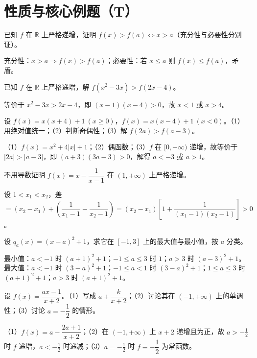 \section{性质与核心例题（T）}

\begin{problem}
已知 $f$ 在 $\mathbb{R}$ 上严格递增，证明 $f(x)>f(a)\iff x>a$（充分性与必要性分别证）。
\end{problem}
\begin{solution}
充分性：$x>a\Rightarrow f(x)>f(a)$；必要性：若 $x\le a$ 则 $f(x)\le f(a)$，矛盾。
\end{solution}

\begin{problem}
已知 $f$ 在 $\mathbb{R}$ 上严格递增，解 $f(x^2-3x)>f(2x-4)$。
\end{problem}
\begin{solution}
等价于 $x^2-3x>2x-4$，即 $(x-1)(x-4)>0$，故 $x<1$ 或 $x>4$。
\end{solution}

\begin{problem}
设 $f(x)=x(x+4)+1\ (x\ge0)$，$f(x)=x(x-4)+1\ (x<0)$。（1）用绝对值统一；（2）判断奇偶性；（3）解 $f(2a)>f(a-3)$。
\end{problem}
\begin{solution}
（1）$f(x)=x^2+4|x|+1$；（2）偶函数；（3）$f$ 在 $[0,+\infty)$ 递增，故等价于 $|2a|>|a-3|$，即 $(a+3)(3a-3)>0$，解得 $a<-3$ 或 $a>1$。
\end{solution}

\begin{problem}
不用导数证明 $f(x)=x-\dfrac{1}{x-1}$ 在 $(1,+\infty)$ 上严格递增。
\end{problem}
\begin{solution}
设 $1<x_1<x_2$，差 $=(x_2-x_1)+\left(\dfrac{1}{x_1-1}-\dfrac{1}{x_2-1}\right)=(x_2-x_1)\left[1+\dfrac{1}{(x_1-1)(x_2-1)}\right]>0$。
\end{solution}

\begin{problem}
设 $q_a(x)=(x-a)^2+1$，求它在 $[-1,3]$ 上的最大值与最小值，按 $a$ 分类。
\end{problem}
\begin{solution}
最小值：$a<-1$ 时 $(a+1)^2+1$；$-1\le a\le3$ 时 $1$；$a>3$ 时 $(a-3)^2+1$。
最大值：$a<-1$ 时 $(3-a)^2+1$；$-1\le a<1$ 时 $(3-a)^2+1$；$1\le a\le3$ 时 $(a+1)^2+1$；$a>3$ 时 $(a+1)^2+1$。
\end{solution}

\begin{problem}
设 $f(x)=\dfrac{ax-1}{x+2}$。（1）写成 $a+\dfrac{k}{x+2}$；（2）讨论其在 $(-1,+\infty)$ 上的单调性；（3）讨论 $a=-\dfrac12$ 的情形。
\end{problem}
\begin{solution}
（1）$f(x)=a-\dfrac{2a+1}{x+2}$；（2）在 $(-1,+\infty)$ 上 $x+2$ 递增且为正，故 $a>-\tfrac12$ 时 $f$ 递增，$a<-\tfrac12$ 时递减；（3）$a=-\tfrac12$ 时 $f\equiv-\dfrac12$ 为常函数。
\end{solution}

